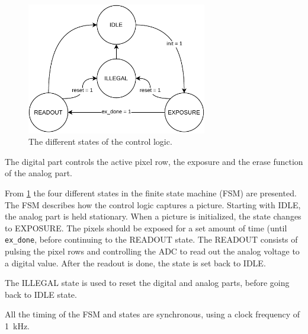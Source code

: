 \begin{figure}[!htbp]
    \centering
    \includegraphics[width=0.7\textwidth]{Images/other/re_control_state.pdf}
    \caption{The different states of the control logic.}
    \label{fig:system:dig:states}
\end{figure}

The digital part controls the active pixel row, the exposure and the erase function of the analog part. 


From \cref{fig:system:dig:states} the four different states in the finite state machine (FSM) are presented. 
The FSM describes how the control logic captures a picture.
Starting with IDLE, the analog part is held stationary. 
When a picture is initialized, the state changes to EXPOSURE.
The pixels should be exposed for a set amount of time (until \texttt{ex\_done}, before continuing to the READOUT state. 
The READOUT consists of pulsing the pixel rows and controlling the ADC to read out the analog voltage to a digital value. 
After the readout is done, the state is set back to IDLE. 

The ILLEGAL state is used to reset the digital and analog parts, before going back to IDLE state.

All the timing of the FSM and states are synchronous, using a clock frequency of \SI{1}{\kilo\hertz}.